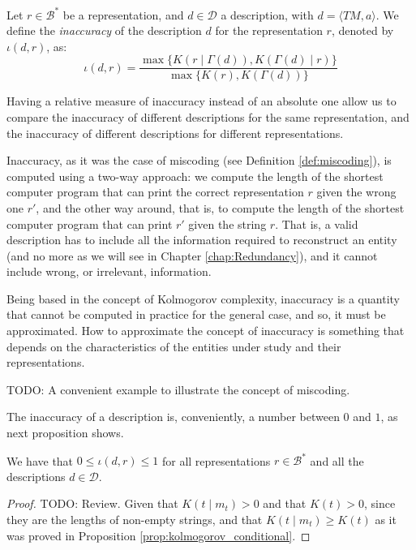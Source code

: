 \begin{definition} [Inaccuracy]
\label{def:inaccuracy:inaccuracy:inaccuracy}
Let $r \in \mathcal{B}^\ast$ be a representation, and $d \in \mathcal{D}$ a description, with $d = \langle TM, a \rangle$. We define the \emph{inaccuracy} of the description $d$ for the representation $r$, denoted by $\iota(d, r)$, as:
\[
\iota(d, r) = \frac{ \max\{ K \left(r \mid \Gamma(d) \right), K \left( \Gamma(d) \mid r \right) \} } { \max\{ K(r), K \left(\Gamma(d) \right) \} }
\]
\end{definition}

Having a relative measure of inaccuracy instead of an absolute one allow us to compare the inaccuracy of different descriptions for the same representation, and the inaccuracy of different descriptions for different representations.

Inaccuracy, as it was the case of miscoding (see Definition \ref{def:miscoding}), is computed using a two-way approach: we compute the length of the shortest computer program that can print the correct representation $r$ given the wrong one $r'$, and the other way around, that is, to compute the length of the shortest computer program that can print $r'$ given the string $r$. That is, a valid description has to include all the information required to reconstruct an entity (and no more as we will see in Chapter \ref{chap:Redundancy}), and it cannot include wrong, or irrelevant, information.

Being based in the concept of Kolmogorov complexity, inaccuracy is a quantity that cannot be computed in practice for the general case, and so, it must be approximated. How to approximate the concept of inaccuracy is something that depends on the characteristics of the entities under study and their representations.

\begin{example}
{\color{red} TODO: A convenient example to illustrate the concept of miscoding.}
\end{example}

The inaccuracy of a description is, conveniently, a number between $0$ and $1$, as next proposition shows.

\begin{proposition}
\label{prop:inaccuracy:inaccuracy:range}
We have that $0 \leq \iota(d, r) \leq 1$ for all representations $r \in \mathcal{B}^\ast$ and all the descriptions $d \in \mathcal{D}$.
\end{proposition}
\begin{proof}
{\color{red} TODO: Review.} Given that $K(t \mid m_t)>0$ and that $K(t)>0$, since they are the lengths of non-empty strings, and that $K(t \mid m_t)  \geq K(t)$ as it was proved in Proposition \ref{prop:kolmogorov_conditional}.
\end{proof}

